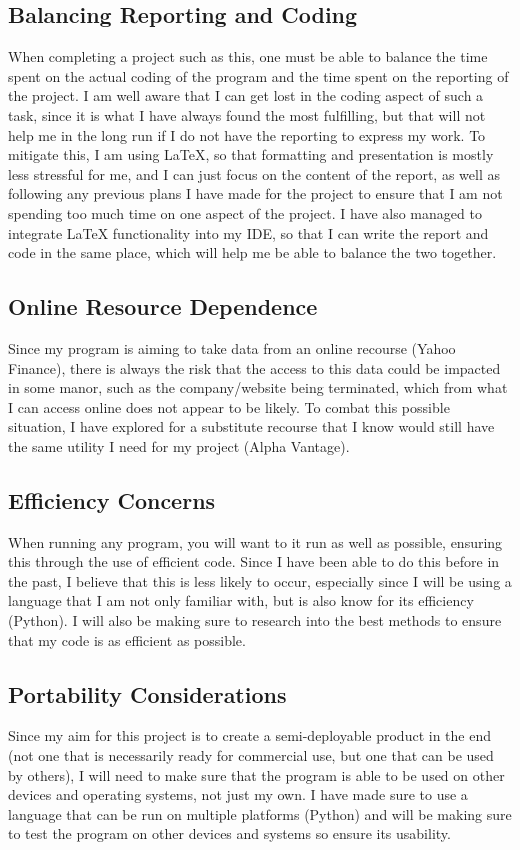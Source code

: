 \documentclass{article}
\begin{document}
\subsection{Balancing Reporting and Coding}
When completing a project such as this, one must be able to balance the time spent on the actual coding of the program and the time spent on the reporting of the project. I am well aware that I can get lost in the coding aspect of such a task, since it is what I have always found the most fulfilling, but that will not help me in the long run if I do not have the reporting to express my work. To mitigate this, I am using LaTeX, so that formatting and presentation is mostly less stressful for me, and I can just focus on the content of the report, as well as following any previous plans I have made for the project to ensure that I am not spending too much time on one aspect of the project. I have also managed to integrate LaTeX functionality into my IDE, so that I can write the report and code in the same place, which will help me be able to balance the two together.

\subsection{Online Resource Dependence}
Since my program is aiming to take data from an online recourse (Yahoo Finance), there is always the risk that the access to this data could be impacted in some manor, such as the company/website being terminated, which from what I can access online does not appear to be likely. To combat this possible situation, I have explored for a substitute recourse that I know would still have the same utility I need for my project (Alpha Vantage).

\subsection{Efficiency Concerns}
When running any program, you will want to it run as well as possible, ensuring this through the use of efficient code. Since I have been able to do this before in the past, I believe that this is less likely to occur, especially since I will be using a language that I am not only familiar with, but is also know for its efficiency (Python). I will also be making sure to research into the best methods to ensure that my code is as efficient as possible.

\subsection{Portability Considerations}
Since my aim for this project is to create a semi-deployable product in the end (not one that is necessarily ready for commercial use, but one that can be used by others), I will need to make sure that the program is able to be used on other devices and operating systems, not just my own. I have made sure to use a language that can be run on multiple platforms (Python) and will be making sure to test the program on other devices and systems so ensure its usability.
\end{document}
